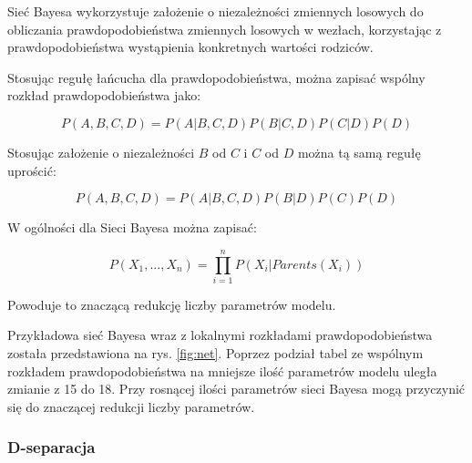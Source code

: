 \documentclass[12pt]{article}
\begin{document}
Sieć Bayesa wykorzystuje założenie o niezależności zmiennych losowych do obliczania prawdopodobieństwa zmiennych losowych w wezłach, korzystając z prawdopodobieństwa wystąpienia konkretnych wartości rodziców. 

Stosując regułę łańcucha dla prawdopodobieństwa, można zapisać wspólny rozkład prawdopodobieństwa jako:

\begin{equation}
	P(A, B, C, D) = P(A|B, C, D)P(B|C, D)P(C|D)P(D)
\end{equation}

Stosując założenie o niezależności $B$ od $C$ i $C$ od $D$ można tą samą regułę uprościć:

\begin{equation}
	P(A, B, C, D) = P(A|B, C, D)P(B|D)P(C)P(D)
\end{equation}

W ogólności dla Sieci Bayesa można zapisać:

\begin{equation}
	P(X_1, ... , X_n) = \prod_{i=1}^{n} P(X_i|Parents(X_i))
\end{equation}

Powoduje to znaczącą redukcję liczby parametrów modelu.

Przykładowa sieć Bayesa wraz z lokalnymi rozkładami prawdopodobieństwa została przedstawiona na rys. \ref{fig:net}. Poprzez podział tabel ze wspólnym rozkładem prawdopodobieństwa na mniejsze ilość parametrów modelu uległa zmianie z 15 do 18. Przy rosnącej ilości parametrów sieci Bayesa mogą przyczynić się do znaczącej redukcji liczby parametrów.

\subsubsection{D-separacja}
\end{document}
